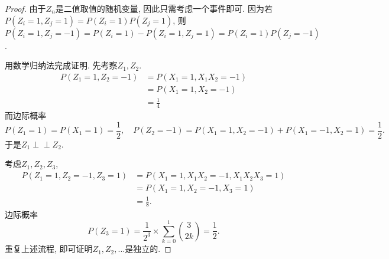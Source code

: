 \documentclass[UTF8, a4paper]{article}
\newcommand{\Perp}{\perp\!\!\!\!\perp}
\begin{document}
\begin{proof}
由于\(Z_n\)是二值取值的随机变量, 因此只需考虑一个事件即可.
因为若\(P(Z_i = 1, Z_j = 1) = P(Z_i = 1)P(Z_j = 1)\), 则
\(P(Z_i = 1, Z_j = -1) = P(Z_i = 1) - P(Z_i = 1, Z_j = 1) = P(Z_i = 1)P(Z_j = -1)\).


用数学归纳法完成证明. 先考察\(Z_1, Z_2\).
$$
\begin{aligned}
    P(Z_1 = 1, Z_2 = -1) &= P(X_1 = 1, X_1 X_2 = -1) \\
    &= P(X_1 = 1, X_2 = -1) \\ 
    &= \frac{1}{4} 
\end{aligned}
$$
而边际概率
$$
P(Z_1 = 1) = P(X_1 = 1) = \frac{1}{2}, \quad P(Z_2 = -1) = P(X_1 = 1, X_2 = -1) + P(X_1 = -1, X_2 = 1) = \frac{1}{2}.
$$
于是\(Z_1 \Perp Z_2\).

考虑\(Z_1, Z_2, Z_3\), 
$$
\begin{aligned}
    P(Z_1 = 1, Z_2 = -1, Z_3 = 1) &= P(X_1 = 1, X_1X_2 = -1, X_1X_2X_3 = 1) \\
    &= P(X_1 = 1, X_2 = -1, X_3 = 1) \\
    &= \frac{1}{8}.
\end{aligned}
$$
边际概率
$$
P(Z_3 = 1) = \frac{1}{2^3} \times \sum_{k=0}^{1}\binom{3}{2k} = \frac{1}{2}.
$$
重复上述流程, 即可证明\(Z_1, Z_2, ...\)是独立的.
\end{proof}
\end{document}
